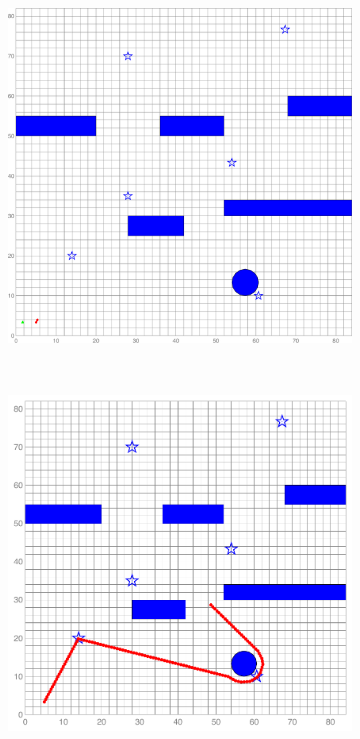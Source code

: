 \documentclass[letterpaper, 10 pt, conference]{ieeeconf}
\begin{document}
	\begin{figure}
		\centering
		\begin{subfigure}{0.2\textwidth}
			\includegraphics[width=\textwidth]{figures/ref_traj_init}
			\caption{}
			\label{fig:ref_traj_init}
		\end{subfigure}
		~
		\begin{subfigure}{0.2\textwidth}
			\includegraphics[width=\textwidth]{figures/ref_traj_obs1}

\end{subfigure}
\end{figure}
\end{document}
